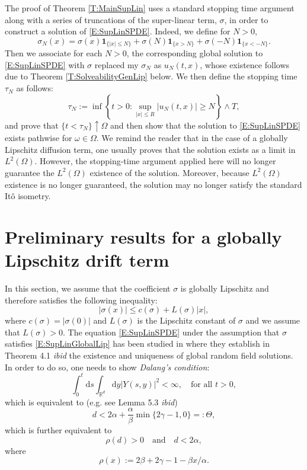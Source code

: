 \documentclass[12pt]{report}
\theoremstyle{plain}
\theoremstyle{definition}
\numberwithin{equation}{section}
\newcommand{\R}{\mathbb{R}}
\newcommand{\ud}{\ensuremath{ \mathrm{d} }}
\newcommand{\Ito}{It\^{o} }
\begin{document}
The proof of Theorem \ref{T:MainSupLin} uses a standard stopping time argument along with a series of truncations of the super-linear term, $\sigma$, in order to construct a solution of \eqref{E:SupLinSPDE}. Indeed, we define for $ N >0$,
\[
\sigma_N(x) = \sigma(x) \mathbf{1}_{\{ |x| \le N \}} + \sigma(N)\mathbf{1}_{ \{ x > N \}} + \sigma(-N)\mathbf{1}_{\{ x < -N\}}.
\]
Then we associate for each $N>0$, the corresponding global solution to \eqref{E:SupLinSPDE} with $\sigma$ replaced my $\sigma_N$ as $u_N(t,x)$, whose existence follows due to Theorem \ref{T:SolveabilityGenLip} below. We then define the stopping time $\tau_N$ as follows:
\[
\tau_N := \inf \left\{ t>0 : \sup_{|x| \le R} |u_N(t,x)| \ge N \right\} \wedge T,
\]
and prove that $\{t < \tau_N\} \uparrow \Omega$ and then show that the solution to \eqref{E:SupLinSPDE} exists pathwise for $\omega \in \Omega$. We remind the reader that in the case of a globally Lipschitz diffusion term, one usually proves that the solution exists as a limit in $L^2(\Omega)$. However, the stopping-time argument applied here will no longer guarantee the $L^2(\Omega)$ existence of the solution. Moreover, because $L^2(\Omega)$ existence is no longer guaranteed, the solution may no longer satisfy the standard \Ito isometry. 

\section{Preliminary results for a globally Lipschitz drift term}

In this section, we assume that the coefficient $\sigma$ is globally Lipschitz and therefore satisfies the following inequality:
\begin{equation} \label{E:SupLinGlobalLip}
|\sigma(x)| \le c(\sigma) + L(\sigma)|x|,
\end{equation}
where $c(\sigma) = |\sigma(0)|$ and $L(\sigma)$ is the Lipschitz constant of $\sigma$ and we assume that $L(\sigma)>0$. The equation \eqref{E:SupLinSPDE} under the assumption that $\sigma$ satisfies \eqref{E:SupLinGlobalLip} has been studied in \cite{chen.hu.ea:19:nonlinear} where they establish in Theorem 4.1 {\em ibid} the existence and uniqueness of global random field solutions. In order to do so, one needs to show {\em Dalang's condition}:
\begin{equation}
\label{C:Dalang}
\int_0^t \ud s \int_{\R^d} \ud y |Y(s,y)|^2 < \infty, \quad \text{for all } t>0,
\end{equation} 
which is equivalent to (e.g. see Lemma 5.3 {\em ibid})
\begin{equation}
\label{E:DalangEquiv}
d < 2\alpha + \frac{\alpha}{\beta}\min\{2\gamma -1, 0\} =: \Theta,
\end{equation}
which is further equivalent to 
\begin{equation} \label{E:DalangEquiv2}
\rho(d) > 0 \quad \text{and} \quad d < 2\alpha,
\end{equation}
where 
\begin{equation} \label{D:rho}
\rho(x) := 2\beta + 2\gamma -1 -\beta x / \alpha.
\end{equation} 
\end{document}
